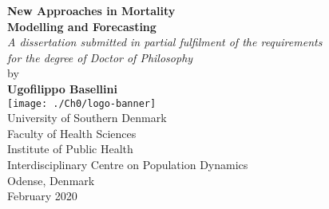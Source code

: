 \documentclass[Thesis]{subfiles}
\begin{document}
\begin{titlepage}
	\thispagestyle{empty}  %
	\begin{center}
		{\quad\par\vspace{0.5cm}}
		{\Huge \textbf{New Approaches in Mortality \\ \medskip Modelling and Forecasting}}
		\vspace{2cm}\\
		{\textit{\Large A dissertation submitted in partial fulfilment of the requirements \\ for the degree of Doctor of Philosophy}}
		\vspace{1.75cm}\\
		{\Large by \\ 
		\vspace{0.75cm} \huge \textbf{Ugofilippo Basellini}}
		\vspace{2cm}\\
		\texttt{[image: ./Ch0/logo-banner]}
		\vspace{2.0cm}\\
		\vfill
		\singlespacing
		\large
		University of Southern Denmark\\
		Faculty of Health Sciences\\
		Institute of Public Health\\
		Interdisciplinary Centre on Population Dynamics\\
		\vspace{1cm}
		Odense, Denmark\\
		February 2020
	\end{center}
\end{titlepage}
\end{document}
